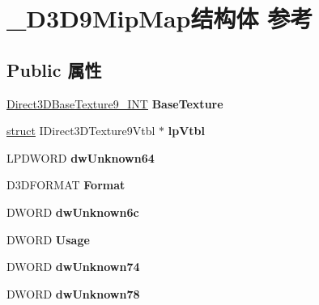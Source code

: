 \hypertarget{struct___d3_d9_mip_map}{}\section{\+\_\+\+D3\+D9\+Mip\+Map结构体 参考}
\label{struct___d3_d9_mip_map}
\subsection*{Public 属性}
\begin{DoxyCompactItemize}
\item 
\mbox{\label{struct___d3_d9_mip_map_a0e2e9a82a06ca44a666137fc085d8946}} 
\hyperlink{struct___direct3_d_base_texture9___i_n_t}{Direct3\+D\+Base\+Texture9\+\_\+\+I\+NT} {\bfseries Base\+Texture}
\item 
\mbox{\label{struct___d3_d9_mip_map_a3322ba8cb455bf6b51c737b7fa29ed08}} 
\hyperlink{interfacestruct}{struct} I\+Direct3\+D\+Texture9\+Vtbl $\ast$ {\bfseries lp\+Vtbl}
\item 
\mbox{\label{struct___d3_d9_mip_map_af034227ba50f1fd9c7a36dd4243a8ada}} 
L\+P\+D\+W\+O\+RD {\bfseries dw\+Unknown64}
\item 
\mbox{\label{struct___d3_d9_mip_map_a1edae37aa1361045af0506057a1ae959}} 
D3\+D\+F\+O\+R\+M\+AT {\bfseries Format}
\item 
\mbox{\label{struct___d3_d9_mip_map_a827b9cd8b877e94a37ff1ce6d32a8135}} 
D\+W\+O\+RD {\bfseries dw\+Unknown6c}
\item 
\mbox{\label{struct___d3_d9_mip_map_ad19bceaeb61ed316460248b290d09440}} 
D\+W\+O\+RD {\bfseries Usage}
\item 
\mbox{\label{struct___d3_d9_mip_map_af6b8d7581bbbb0457a70f3191fe76964}} 
D\+W\+O\+RD {\bfseries dw\+Unknown74}
\item 
\mbox{\label{struct___d3_d9_mip_map_a38291b39267b8cbd97a1cbe2529aba4e}} 
D\+W\+O\+RD {\bfseries dw\+Unknown78}
\item 
\mbox{\label{struct___d3_d9_mip_map_a8334f745ed01c8562e2860ab183f3166}} 

\end{DoxyCompactItemize}
